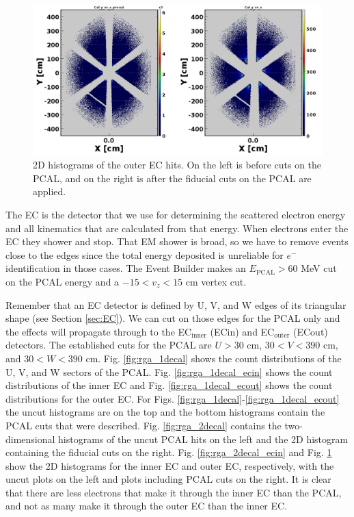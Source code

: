 \begin{figure}[H]
	\centering
	\includegraphics[width=0.9\linewidth]{figures/rga/2d_ecal_ECOUT.png}
	\caption{2D histograms of the outer EC hits. On the left is before cuts on the PCAL, and on the right is after the fiducial cuts on the PCAL are applied.}
	\label{fig:rga_2decal_ecout}
\end{figure}

The EC is the detector that we use for determining the scattered electron energy and all kinematics that are calculated from that energy. When electrons enter the EC they shower and stop. That EM shower is broad, so we have to remove events close to the edges since the total energy deposited is unreliable for $e^-$ identification in those cases. The Event Builder makes an $E_{\mathrm{PCAL}}>60$ MeV cut on the PCAL energy and a $-15<v_z<15$ cm vertex cut.

Remember that an EC detector is defined by U, V, and W edges of its triangular shape (see Section \ref{sec:EC}). We can cut on those edges for the PCAL only and the effects will propagate through to the EC$_{\mathrm{inner}}$ (ECin) and EC$_{\mathrm{outer}}$ (ECout) detectors. The established cuts for the PCAL are $U>30$ cm, $30<V<390$ cm, and $30<W<390$ cm. Fig. \ref{fig:rga_1decal} shows the count distributions of the U, V, and W sectors of the PCAL. Fig. \ref{fig:rga_1decal_ecin} shows the count distributions of the inner EC and Fig. \ref{fig:rga_1decal_ecout} shows the count distributions for the outer EC. For Figs. \ref{fig:rga_1decal}-\ref{fig:rga_1decal_ecout} the uncut histograms are on the top and the bottom histograms contain the PCAL cuts that were described. Fig. \ref{fig:rga_2decal} contains the two-dimensional histograms of the uncut PCAL hits on the left and the 2D histogram containing the fiducial cuts on the right. Fig. \ref{fig:rga_2decal_ecin} and Fig. \ref{fig:rga_2decal_ecout} show the 2D histograms for the inner EC and outer EC, respectively, with the uncut plots on the left and plots including PCAL cuts on the right. It is clear that there are less electrons that make it through the inner EC than the PCAL, and not as many make it through the outer EC than the inner EC.

